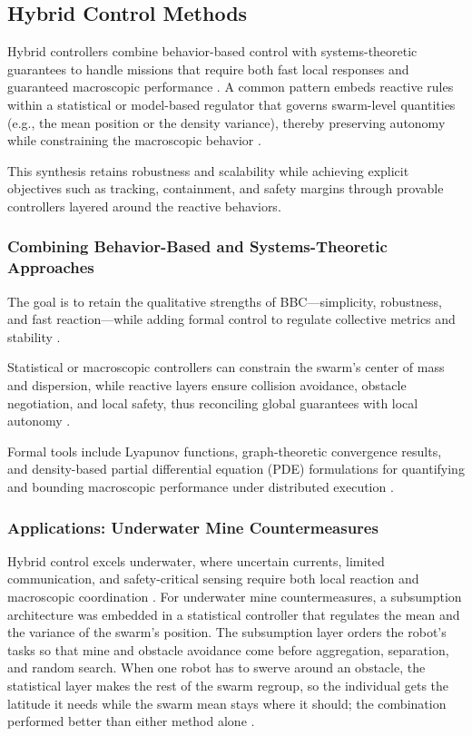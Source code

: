 \subsection{Hybrid Control Methods}

Hybrid controllers combine behavior-based control with systems-theoretic
guarantees to handle missions that require both fast local responses and
guaranteed macroscopic performance \cite{hamann2018swarm}. A common pattern embeds reactive
rules within a statistical or model-based regulator that governs swarm-level
quantities (e.g., the mean position or the density variance), thereby preserving
autonomy while constraining the macroscopic behavior \cite{hamann2008space}.

This synthesis retains robustness and scalability while achieving explicit
objectives such as tracking, containment, and safety margins through provable
controllers layered around the reactive behaviors.

\subsubsection{Combining Behavior-Based and Systems-Theoretic Approaches}

The goal is to retain the qualitative strengths of BBC---simplicity, robustness,
and fast reaction---while adding formal control to regulate collective metrics
and stability \cite{hamann2018swarm}.

Statistical or macroscopic controllers can constrain the swarm's center of mass
and dispersion, while reactive layers ensure collision avoidance, obstacle
negotiation, and local safety, thus reconciling global guarantees with local
autonomy \cite{hamann2008space}.

Formal tools include Lyapunov functions, graph-theoretic convergence results,
and density-based partial differential equation (PDE) formulations for
quantifying and bounding macroscopic performance under distributed execution
\cite{hamann2018swarm}.

\subsubsection{Applications: Underwater Mine Countermeasures}

Hybrid control excels underwater, where uncertain currents, limited
communication, and safety-critical sensing require both local reaction and
macroscopic coordination \cite{tan2004evaluation}. For underwater mine
countermeasures, a subsumption architecture was embedded in a statistical
controller that regulates the mean and the variance of the swarm's position.
The subsumption layer orders the robot's tasks so that mine and obstacle
avoidance come before aggregation, separation, and random search. When one robot
has to swerve around an obstacle, the statistical layer makes the rest of the
swarm regroup, so the individual gets the latitude it needs while the swarm mean
stays where it should; the combination performed better than either method
alone \cite{tan2004evaluation}.


